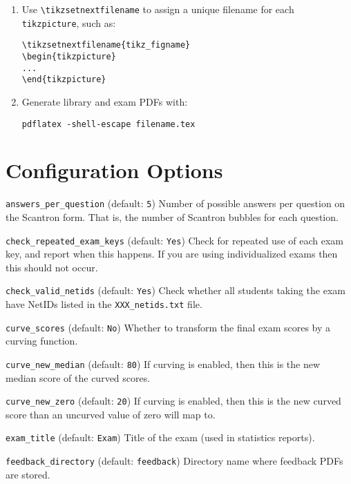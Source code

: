 \documentclass{article}
\begin{document}
\begin{enumerate}
\begin{enumerate}
  \item Use \verb+\tikzsetnextfilename+ to assign a unique filename for
    each \texttt{tikzpicture}, such as:
\begin{verbatim}
\tikzsetnextfilename{tikz_figname}
\begin{tikzpicture}
...
\end{tikzpicture}
\end{verbatim}
  \item Generate library and exam PDFs with:
\begin{verbatim}
pdflatex -shell-escape filename.tex
\end{verbatim}
  \end{enumerate}
\end{enumerate}

\section{Configuration Options}

\hangindent=1cm \texttt{answers_per_question} (default: \texttt{5})
Number of possible answers per question on the Scantron form. That is,
the number of Scantron bubbles for each question.

\hangindent=1cm \texttt{check_repeated_exam_keys} (default:
\texttt{Yes}) Check for repeated use of each exam key, and report when
this happens. If you are using individualized exams then this should
not occur.

\hangindent=1cm \texttt{check_valid_netids} (default: \texttt{Yes})
Check whether all students taking the exam have NetIDs listed in the
\texttt{XXX_netids.txt} file.

\hangindent=1cm \texttt{curve_scores} (default: \texttt{No}) Whether
to transform the final exam scores by a curving function.

\hangindent=1cm \texttt{curve_new_median} (default: \texttt{80}) If
curving is enabled, then this is the new median score of the curved
scores.

\hangindent=1cm \texttt{curve_new_zero} (default: \texttt{20}) If
curving is enabled, then this is the new curved score than an uncurved
value of zero will map to.

\hangindent=1cm \texttt{exam_title} (default: \texttt{Exam}) Title of
the exam (used in statistics reports).

\hangindent=1cm \texttt{feedback_directory} (default:
\texttt{feedback}) Directory name where feedback PDFs are stored.
\end{document}
